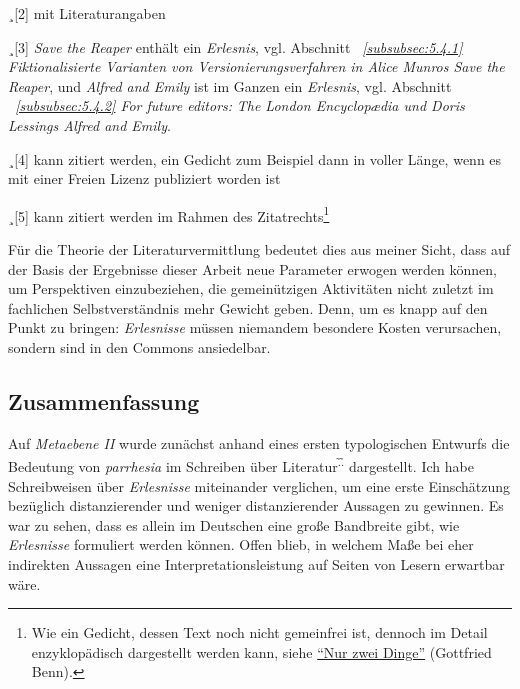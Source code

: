 \documentclass[fontsize=12pt]{scrartcl}
\begin{document}
\footnotesize{¸[2] mit Literaturangaben\\
\footnotesize{¸[3] \textit{Save the Reaper} enth\"alt ein \textit{Erlesnis}, vgl. Abschnitt \textit{~\ref{subsubsec:5.4.1} Fiktionalisierte Varianten von Versionierungsverfahren in Alice Munros \flq Save the Reaper\frq}, und \textit{Alfred and Emily} ist im Ganzen ein \textit{Erlesnis}, vgl. Abschnitt \textit{~\ref{subsubsec:5.4.2} \flq For future editors\frq:\,\,\textit{The London Encyclop{\ae}dia} und Doris Lessings \textit{Alfred and Emily}}.\\
\footnotesize{¸[4] kann zitiert werden, ein Gedicht zum Beispiel dann in voller L\"ange, wenn es mit einer Freien Lizenz pu\-bli\-ziert worden ist\\ 
\footnotesize{¸[5] kann zitiert werden im Rahmen des Zitatrechts\footnote{Wie ein Gedicht, dessen Text noch nicht gemeinfrei ist, dennoch im Detail enzy\-klop\"adisch dargestellt werden kann, siehe \href{http://de.wikipedia.org/wiki/Nur_zwei_Dinge}{"`Nur zwei Dinge"'} (Gottfried Benn).}\\
\onehalfspacing

\normalsize
F\"ur die Theorie der Li\-te\-ra\-tur\-ver\-mitt\-lung bedeutet dies aus meiner Sicht, dass auf der Basis der Ergebnisse dieser Arbeit neue Parameter erwogen werden k\"onnen, um Perspektiven einzubeziehen, die gemein\"utzigen Ak\-ti\-vi\-t\"aten nicht zu\-letzt im fachlichen \mbox{Selbst}verst\"andnis mehr Gewicht geben. Denn, um es knapp auf den Punkt zu bringen: \textit{Erlesnisse} m\"ussen niemandem besondere Kosten verursachen, sondern sind in den Commons ansiedelbar.

\subsection{Zusammenfassung}
\label{subsec:7.3}

Auf \textit{Metaebene II} wurde zun\"achst anhand eines ersten typologischen Entwurfs die Bedeutung von \textit{parrhesia} im Schrei\-ben \"uber Li\-te\-ra\-tur\textsuperscript{\~.\~.} dargestellt. Ich habe Schreib\-weisen \"uber \textit{Erlesnisse} miteinander verglichen, um eine erste Einsch\"atzung bez\"uglich distanzierender und weniger distanzierender Aussagen zu gewinnen. Es war zu sehen, dass es allein im Deutschen eine gro{\ss}e Bandbreite gibt, wie \textit{Erlesnisse} formuliert werden k\"onnen. Offen blieb, in welchem Ma{\ss}e bei eher indirekten Aussagen eine Interpretationsleistung auf Sei\-ten von Lesern\textsuperscript{\tiny *} erwartbar w\"are.

}}}}
\end{document}
